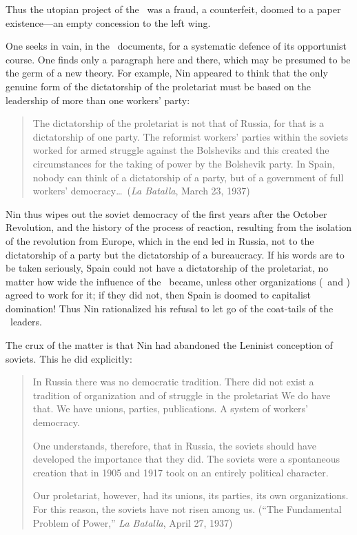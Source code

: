 Thus the utopian project of the \POUM\ was a fraud, a counterfeit, doomed to a paper existence---an empty concession to the left wing.

One seeks in vain, in the \POUM\ documents, for a systematic defence of its opportunist course. One finds only a paragraph here and there, which may be presumed to be the germ of a new theory. For example, Nin appeared to think that the only genuine form of the dictatorship of the proletariat must be based on the leadership of more than one workers’ party:

\begin{quotation}
  The dictatorship of the proletariat is not that of Russia, for that is a dictatorship of one party. The reformist workers’ parties within the soviets worked for armed struggle against the Bolsheviks and this created the circumstances for the taking of power by the Bolshevik party. In Spain, nobody can think of a dictatorship of a party, but of a government of full workers’ democracy\dots\ (\emph{La Batalla}, March 23, 1937)
\end{quotation}

Nin thus wipes out the soviet democracy of the first years after the October Revolution, and the history of the process of reaction, resulting from the isolation of the revolution from Europe, which in the end led in Russia, not to the dictatorship of a party but the dictatorship of a bureaucracy. If his words are to be taken seriously, Spain could not have a dictatorship of the proletariat, no matter how wide the influence of the \POUM\ became, unless other organizations (\FAI\ and \CNT) agreed to work for it; if they did not, then Spain is doomed to capitalist domination! Thus Nin rationalized his refusal to let go of the coat-tails of the \CNT\ leaders.

The crux of the matter is that Nin had abandoned the Leninist conception of soviets. This he did explicitly:

\begin{quotation}
  In Russia there was no democratic tradition. There did not exist a tradition of organization and of struggle in the proletariat We do have that. We have unions, parties, publications. A system of workers’ democracy.
  
  One understands, therefore, that in Russia, the soviets should have developed the importance that they did. The soviets were a spontaneous creation that in 1905 and 1917 took on an entirely political character.
  
  Our proletariat, however, had its unions, its parties, its own organizations. For this reason, the soviets have not risen among us. (``The Fundamental Problem of Power,'' \emph{La Batalla}, April 27, 1937)
\end{quotation}

